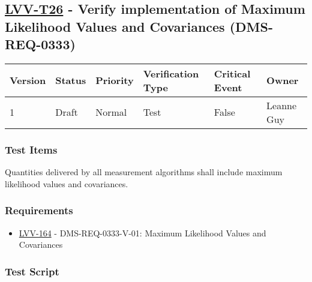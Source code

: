 \hypertarget{lvv-t26---verify-implementation-of-maximum-likelihood-values-and-covariances-dms-req-0333}{%
\subsection{\texorpdfstring{\href{https://jira.lsstcorp.org/secure/Tests.jspa\#/testCase/LVV-T26}{LVV-T26}
- Verify implementation of Maximum Likelihood Values and Covariances
(DMS-REQ-0333)}{LVV-T26 - Verify implementation of Maximum Likelihood Values and Covariances (DMS-REQ-0333)}}\label{lvv-t26---verify-implementation-of-maximum-likelihood-values-and-covariances-dms-req-0333}}

\begin{longtable}[]{@{}llllll@{}}
\toprule
Version & Status & Priority & Verification Type & Critical Event &
Owner\tabularnewline
\midrule
\endhead
1 & Draft & Normal & Test & False & Leanne Guy\tabularnewline
\bottomrule
\end{longtable}

\hypertarget{test-items-3}{%
\subsubsection{Test Items}\label{test-items-3}}

Quantities delivered by all measurement algorithms shall include maximum
likelihood values and covariances.

\hypertarget{requirements-3}{%
\subsubsection{Requirements}\label{requirements-3}}

\begin{itemize}
\tightlist
\item
  \href{https://jira.lsstcorp.org/browse/LVV-164}{LVV-164} -
  DMS-REQ-0333-V-01: Maximum Likelihood Values and Covariances
\end{itemize}

\hypertarget{test-script-3}{%
\subsubsection{Test Script}\label{test-script-3}}

